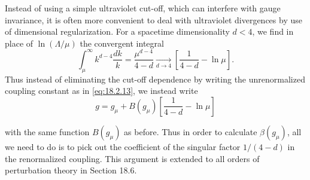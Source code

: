 Instead of using a simple ultraviolet cut-off, which can interfere with gauge
invariance, it is often more convenient to deal with ultraviolet divergences
by use of dimensional regularization. For a spacetime dimensionality $d<4$,
we find in place of $\ln(\Lambda/\mu)$ the convergent integral
\[
\int_\mu^\infty k^{d-4}\frac{dk}{k}
=\frac{\mu^{d-4}}{4-d}
\underset{d\to4}{\longrightarrow}
\left[\frac{1}{4-d}-\ln\mu\right].
\]
Thus instead of eliminating the cut-off dependence by writing the
unrenormalized coupling constant as in \eqref{eq:18.2.13}, we instead write
\begin{equation}
g=g_\mu+B(g_\mu)\left[\frac{1}{4-d}-\ln\mu\right]
\tag{18.2.16}\label{eq:18.2.16}
\end{equation}
\par\noindent
with the same function $B(g_\mu)$ as before. Thus in order to calculate
$\beta(g_\mu)$, all we need to do is to pick out the coefficient of the
singular factor $1/(4-d)$ in the renormalized coupling. This argument is
extended to all orders of perturbation theory in Section 18.6.

